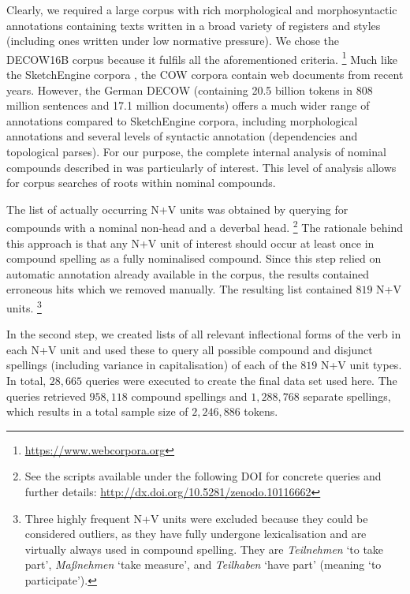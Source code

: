 \documentclass[biblatex, charis, linguex]{glossa}\usepackage{knitr}
\begin{document}
Clearly, we required a large corpus with rich morphological and morphosyntactic annotations containing texts written in a broad variety of registers and styles (including ones written under low normative pressure).
We chose the DECOW16B corpus \parencite{SchaeferBildhauer2012a} because it fulfils all the aforementioned criteria.%
\footnote{\url{https://www.webcorpora.org}}
Much like the SketchEngine corpora \parencite{KilgarriffEa2014}, the COW corpora contain web documents from recent years.
However, the German DECOW (containing 20.5 billion tokens in 808 million sentences and 17.1 million documents) offers a much wider range of annotations compared to SketchEngine corpora, including morphological annotations and several levels of syntactic annotation (dependencies and topological parses).
For our purpose, the complete internal analysis of nominal compounds described in \citet{SchaeferPankratz2018} was particularly of interest.
This level of analysis allows for corpus searches of roots within nominal compounds.

The list of actually occurring N+V units was obtained by querying for compounds with a nominal non-head and a deverbal head.%
\footnote{See the scripts available under the following DOI for concrete queries and further details: \url{http://dx.doi.org/10.5281/zenodo.10116662}}
The rationale behind this approach is that any N+V unit of interest should occur at least once in compound spelling as a fully nominalised compound.
Since this step relied on automatic annotation already available in the corpus, the results contained erroneous hits which we removed manually.
The resulting list contained $819$ N+V units.%
\footnote{Three highly frequent N+V units were excluded because they could be considered outliers, as they have fully undergone lexicalisation and are virtually always used in compound spelling.
They are \textit{Teilnehmen} `to take part', \textit{Maßnehmen} `take measure', and \textit{Teilhaben} `have part' (meaning `to participate').}

In the second step, we created lists of all relevant inflectional forms of the verb in each N+V unit and used these to query all possible compound and disjunct spellings (including variance in capitalisation) of each of the $819$ N+V unit types.
In total, $28,665$ queries were executed to create the final data set used here.
The queries retrieved $958,118$ compound spellings and $1,288,768$ separate spellings, which results in a total sample size of $2,246,886$ tokens.
\end{document}
